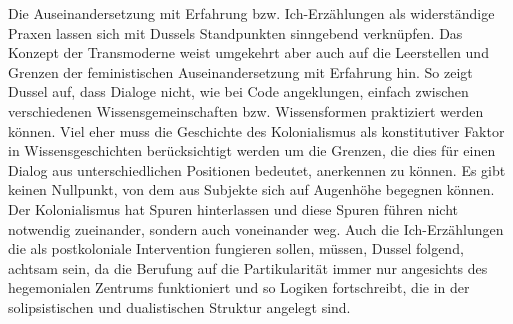 Die Auseinandersetzung mit Erfahrung bzw. Ich-Erzählungen als widerständige
Praxen lassen sich mit Dussels Standpunkten sinngebend verknüpfen. Das Konzept
der Transmoderne weist umgekehrt aber auch auf die Leerstellen und Grenzen der
feministischen Auseinandersetzung mit Erfahrung hin. So zeigt Dussel auf, dass
Dialoge nicht, wie bei Code angeklungen, einfach zwischen verschiedenen
Wissensgemeinschaften bzw. Wissensformen praktiziert werden können. Viel eher
muss die Geschichte des Kolonialismus als konstitutiver Faktor in
Wissensgeschichten berücksichtigt werden um die Grenzen, die dies für einen
Dialog aus unterschiedlichen Positionen bedeutet, anerkennen zu können. Es gibt
keinen Nullpunkt, von dem aus Subjekte sich auf Augenhöhe begegnen können. Der
Kolonialismus hat Spuren hinterlassen und diese Spuren führen nicht notwendig
zueinander, sondern auch voneinander weg. Auch die Ich-Erzählungen die als
postkoloniale Intervention fungieren sollen, müssen, Dussel folgend, achtsam
sein, da die Berufung auf die Partikularität immer nur angesichts des
hegemonialen Zentrums funktioniert und so Logiken fortschreibt, die in der
solipsistischen und dualistischen Struktur angelegt sind.
